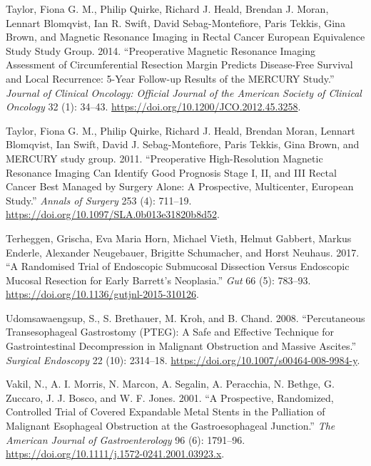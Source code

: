 \documentclass[
  letterpaper,
]{scrbook}
\newlength{\cslhangindent}
\newenvironment{CSLReferences}[2] %
 {\begin{list}{}{%
  \setlength{\itemindent}{0pt}
  \setlength{\leftmargin}{0pt}
  \setlength{\parsep}{0pt}
  \ifodd #1
   \setlength{\leftmargin}{\cslhangindent}
   \setlength{\itemindent}{-1\cslhangindent}
  \fi
  \setlength{\itemsep}{#2\baselineskip}}}
 {\end{list}}
\begin{document}
\begin{CSLReferences}{1}{0}
Taylor, Fiona G. M., Philip Quirke, Richard J. Heald, Brendan J. Moran,
Lennart Blomqvist, Ian R. Swift, David Sebag-Montefiore, Paris Tekkis,
Gina Brown, and Magnetic Resonance Imaging in Rectal Cancer European
Equivalence Study Study Group. 2014. {``Preoperative Magnetic Resonance
Imaging Assessment of Circumferential Resection Margin Predicts
Disease-Free Survival and Local Recurrence: 5-Year Follow-up Results of
the {MERCURY} Study.''} \emph{Journal of Clinical Oncology: Official
Journal of the American Society of Clinical Oncology} 32 (1): 34--43.
\url{https://doi.org/10.1200/JCO.2012.45.3258}.

Taylor, Fiona G. M., Philip Quirke, Richard J. Heald, Brendan Moran,
Lennart Blomqvist, Ian Swift, David J. Sebag-Montefiore, Paris Tekkis,
Gina Brown, and MERCURY study group. 2011. {``Preoperative
High-Resolution Magnetic Resonance Imaging Can Identify Good Prognosis
Stage {I}, {II}, and {III} Rectal Cancer Best Managed by Surgery Alone:
A Prospective, Multicenter, {European} Study.''} \emph{Annals of
Surgery} 253 (4): 711--19.
\url{https://doi.org/10.1097/SLA.0b013e31820b8d52}.

Terheggen, Grischa, Eva Maria Horn, Michael Vieth, Helmut Gabbert,
Markus Enderle, Alexander Neugebauer, Brigitte Schumacher, and Horst
Neuhaus. 2017. {``A Randomised Trial of Endoscopic Submucosal Dissection
Versus Endoscopic Mucosal Resection for Early {Barrett}'s Neoplasia.''}
\emph{Gut} 66 (5): 783--93.
\url{https://doi.org/10.1136/gutjnl-2015-310126}.

Udomsawaengsup, S., S. Brethauer, M. Kroh, and B. Chand. 2008.
{``Percutaneous Transesophageal Gastrostomy ({PTEG}): A Safe and
Effective Technique for Gastrointestinal Decompression in Malignant
Obstruction and Massive Ascites.''} \emph{Surgical Endoscopy} 22 (10):
2314--18. \url{https://doi.org/10.1007/s00464-008-9984-y}.

Vakil, N., A. I. Morris, N. Marcon, A. Segalin, A. Peracchia, N. Bethge,
G. Zuccaro, J. J. Bosco, and W. F. Jones. 2001. {``A Prospective,
Randomized, Controlled Trial of Covered Expandable Metal Stents in the
Palliation of Malignant Esophageal Obstruction at the Gastroesophageal
Junction.''} \emph{The American Journal of Gastroenterology} 96 (6):
1791--96. \url{https://doi.org/10.1111/j.1572-0241.2001.03923.x}.


\end{CSLReferences}
\end{document}
